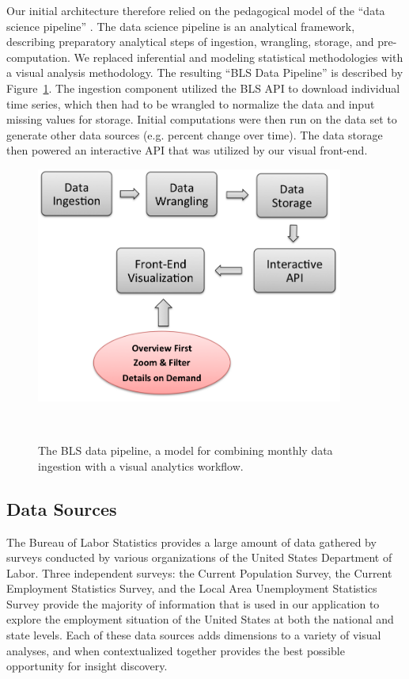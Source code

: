 \documentclass[11pt,letterpaper]{article}
\begin{document}
Our initial architecture therefore relied on the pedagogical model of the ``data science pipeline'' \cite{ojeda_practical_2014}. The data science pipeline is an analytical framework, describing preparatory analytical steps of ingestion, wrangling, storage, and pre-computation. We replaced inferential and modeling statistical methodologies with a visual analysis methodology. The resulting ``BLS Data Pipeline'' is described by Figure~\ref{fig:pipline}. The ingestion component utilized the BLS API to download individual time series, which then had to be wrangled to normalize the data and input missing values for storage. Initial computations were then run on the data set to generate other data sources (e.g. percent change over time). The data storage then powered an interactive API that was utilized by our visual front-end.

\begin{figure}[!h]
    \centering
    \includegraphics[width=0.9\textwidth]{figures/pipeline.png}
    \caption{The BLS data pipeline, a model for combining monthly data ingestion with a visual analytics workflow.}~\label{fig:pipline}
\end{figure}


\subsection{Data Sources}

The Bureau of Labor Statistics provides a large amount of data gathered by surveys conducted by various organizations of the United States Department of Labor. Three independent surveys: the Current Population Survey, the Current Employment Statistics Survey, and the Local Area Unemployment Statistics Survey provide the majority of information that is used in our application to explore the employment situation of the United States at both the national and state levels. Each of these data sources adds dimensions to a variety of visual analyses, and when contextualized together provides the best possible opportunity for insight discovery.
\end{document}
